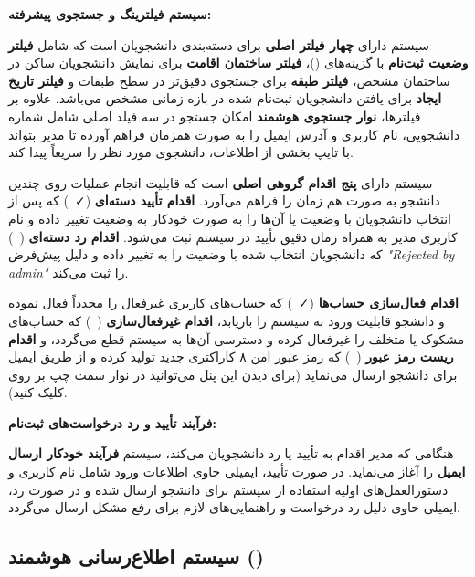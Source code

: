 \documentclass[12pt,a4paper]{report}
\begin{document}
	\textbf{سیستم فیلترینگ و جستجوی پیشرفته:}
	
	سیستم دارای \textbf{چهار فیلتر اصلی} برای دسته‌بندی دانشجویان است که شامل \textbf{فیلتر وضعیت ثبت‌نام} با گزینه‌های ()، \textbf{فیلتر ساختمان اقامت} برای نمایش دانشجویان ساکن در ساختمان مشخص، \textbf{فیلتر طبقه} برای جستجوی دقیق‌تر در سطح طبقات و \textbf{فیلتر تاریخ ایجاد} برای یافتن دانشجویان ثبت‌نام شده در بازه زمانی مشخص می‌باشد. علاوه بر فیلترها، \textbf{نوار جستجوی هوشمند} امکان جستجو در سه فیلد اصلی شامل شماره دانشجویی، نام کاربری و آدرس ایمیل را به صورت همزمان فراهم آورده تا مدیر بتواند با تایپ بخشی از اطلاعات، دانشجوی مورد نظر را سریعاً پیدا کند.
	
	سیستم دارای \textbf{پنج اقدام گروهی اصلی} است که قابلیت انجام عملیات روی چندین دانشجو به صورت هم
	زمان را فراهم می‌آورد. \textbf{اقدام تأیید دسته‌ای} (\faCheck\  ) که پس از انتخاب دانشجویان با وضعیت  یا  آن‌ها را به صورت خودکار به وضعیت  تغییر داده و نام کاربری مدیر به همراه زمان دقیق تأیید در سیستم ثبت می‌شود. \textbf{اقدام رد دسته‌ای} (\faTimes\  ) که دانشجویان انتخاب شده با وضعیت  را به  تغییر داده و دلیل پیش‌فرض \textit{"Rejected by admin"} را ثبت می‌کند.
	
	\textbf{اقدام فعال‌سازی حساب‌ها} (\faCheck\  ) که حساب‌های کاربری غیرفعال را مجدداً فعال نموده و دانشجو قابلیت ورود به سیستم را بازیابد، \textbf{اقدام غیرفعال‌سازی} (\faBan\  ) که حساب‌های مشکوک یا متخلف را غیرفعال کرده و دسترسی آن‌ها به سیستم قطع می‌گردد، و \textbf{اقدام ریست رمز عبور} (\faLock\  ) که رمز عبور امن ۸ کاراکتری جدید تولید کرده و از طریق ایمیل برای دانشجو ارسال می‌نماید (برای دیدن این پنل می‌توانید در نوار سمت چپ بر روی  کلیک کنید).
	
	\textbf{فرآیند تأیید و رد درخواست‌های ثبت‌نام:}
	
	هنگامی که مدیر اقدام به تأیید یا رد دانشجویان می‌کند، سیستم \textbf{فرآیند خودکار ارسال ایمیل} را آغاز می‌نماید. در صورت تأیید، ایمیلی حاوی اطلاعات ورود شامل نام کاربری و دستورالعمل‌های اولیه استفاده از سیستم برای دانشجو ارسال شده و در صورت رد، ایمیلی حاوی دلیل رد درخواست و راهنمایی‌های لازم برای رفع مشکل ارسال می‌گردد.
	
	\subsection{سیستم اطلاع‌رسانی هوشمند ()}
	
\end{document}

